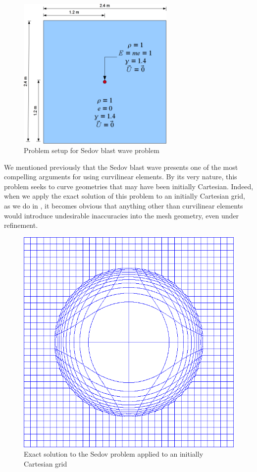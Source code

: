 \begin{figure}[h!]
 \centering
 \includegraphics[width=3in,keepaspectratio=true]{./Figures/SedovExplosion.png}
 \caption{Problem setup for Sedov blast wave problem}
 \label{fig:SedovExplosion}
\end{figure}

We mentioned previously that the Sedov blast wave presents one of the most compelling arguments for using curvilinear elements. By its very nature, this problem seeks to curve geometries that may have been initially Cartesian. Indeed, when we apply the exact solution of this problem to an initially Cartesian grid, as we do in , it becomes obvious that anything other than curvilinear elements would introduce undesirable inaccuracies into the mesh geometry, even under refinement.

\begin{figure}[h!]
 \centering
 \includegraphics[width=5in,keepaspectratio=true]{./Figures/sedovCart.png}
 \caption{Exact solution to the Sedov problem applied to an initially Cartesian grid}
 \label{fig:CartSedov}
\end{figure}

